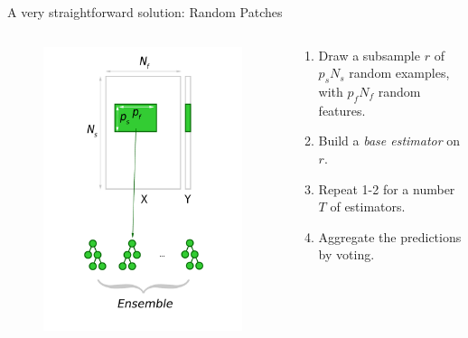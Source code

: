 \documentclass{beamer}
\begin{document}
\begin{frame}{A very straightforward solution: Random Patches}

\begin{columns}[t]
\begin{column}[t]{0.4\textwidth}

\begin{figure}
\vspace{-1cm}
\includegraphics[scale=0.35]{figures/rp-1.pdf}
\end{figure}

\end{column}

\begin{column}{0.6\textwidth}

\begin{enumerate}
\item Draw a subsample $r$ of $p_s N_s$ random examples, with $p_f N_f$ random features.
\item Build a {\it base estimator} on $r$.
\item Repeat 1-2 for a number $T$ of estimators.
\item Aggregate the predictions by voting.
\end{enumerate}


\end{column}
\end{columns}
\end{frame}
\end{document}
